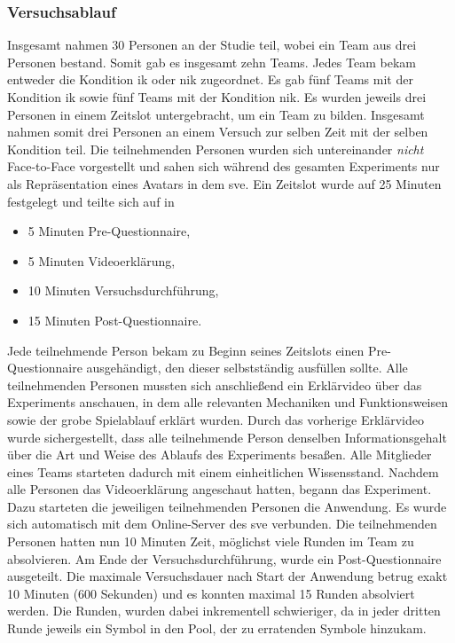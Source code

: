 \documentclass[a4paper,11pt]{article}%
\renewcommand{\\}{\vspace*{0.5\baselineskip} \newline}
\begin{document}
	\subsubsection{Versuchsablauf}
Insgesamt nahmen 30 Personen an der Studie teil, wobei ein Team aus drei Personen bestand. Somit gab es insgesamt zehn Teams. Jedes Team bekam entweder die Kondition \ac{ik} oder \ac{nik} zugeordnet. Es gab fünf Teams mit der Kondition \ac{ik} sowie fünf Teams mit der Kondition \ac{nik}.
Es wurden jeweils drei Personen in einem Zeitslot untergebracht, um ein Team zu bilden.
Insgesamt nahmen somit drei Personen an einem Versuch zur selben Zeit mit der selben Kondition teil. Die teilnehmenden Personen wurden sich untereinander \textit{nicht} Face-to-Face vorgestellt und sahen sich während des gesamten Experiments nur als Repräsentation eines Avatars in dem \ac{sve}. 
Ein Zeitslot wurde auf 25 Minuten festgelegt und teilte sich auf in
		\begin{itemize}
			\item 5 Minuten Pre-Questionnaire,
			\item 5 Minuten Videoerklärung,
			\item 10 Minuten Versuchsdurchführung,
			\item 15 Minuten Post-Questionnaire.
		\end{itemize}
Jede teilnehmende Person bekam zu Beginn seines Zeitslots einen Pre-Questionnaire ausgehändigt, den dieser selbstständig ausfüllen sollte.
Alle teilnehmenden Personen mussten sich anschließend ein Erklärvideo über das Experiments anschauen, in dem alle relevanten Mechaniken und Funktionsweisen sowie der grobe Spielablauf erklärt wurden. Durch das vorherige Erklärvideo wurde sichergestellt, dass alle teilnehmende Person denselben Informationsgehalt über die Art und Weise des Ablaufs des Experiments besaßen. Alle Mitglieder eines Teams starteten dadurch mit einem einheitlichen Wissensstand.
Nachdem alle Personen das Videoerklärung angeschaut hatten, begann das Experiment. Dazu starteten die jeweiligen teilnehmenden Personen die Anwendung. Es wurde sich automatisch mit dem Online-Server des \ac{sve} verbunden. Die teilnehmenden Personen hatten nun 10 Minuten Zeit, möglichst viele Runden im Team zu absolvieren.
	Am Ende der Versuchsdurchführung, wurde ein Post-Questionnaire ausgeteilt. 
Die maximale Versuchsdauer nach Start der Anwendung betrug exakt 10 Minuten (600 Sekunden) und es konnten maximal 15 Runden absolviert werden. Die Runden, wurden dabei inkrementell schwieriger, da in jeder dritten Runde jeweils ein Symbol in den Pool, der zu erratenden Symbole hinzukam. 
\end{document}
